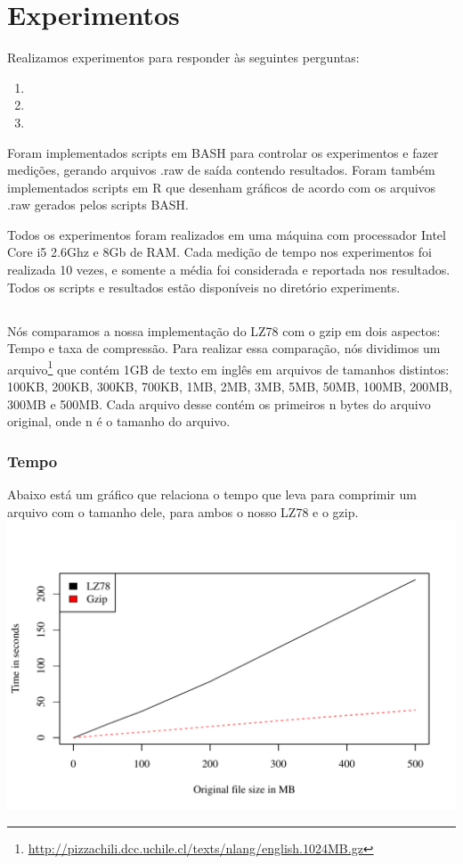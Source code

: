 \section{Experimentos}
Realizamos experimentos para responder às seguintes perguntas:
\begin{enumerate}
\item \rqone
\item \rqtwo
\item \rqthree
\end{enumerate}

Foram implementados scripts em BASH para controlar os experimentos e fazer
medições, gerando arquivos .raw de saída contendo resultados. Foram também
implementados scripts em R que desenham gráficos de acordo com os arquivos .raw
gerados pelos scripts BASH.


Todos os experimentos foram realizados em uma máquina com processador Intel Core
i5 2.6Ghz e 8Gb de RAM. Cada medição de tempo nos experimentos foi realizada 10
vezes, e somente a média foi considerada e reportada nos resultados.
Todos os scripts e resultados estão disponíveis no diretório experiments.

\subsection{\rqone}
Nós comparamos a nossa implementação do LZ78 com o gzip em dois aspectos: Tempo
e taxa de compressão.
Para realizar essa comparação, nós dividimos um arquivo\footnote{
\url{http://pizzachili.dcc.uchile.cl/texts/nlang/english.1024MB.gz}}
que contém 1GB de texto em inglês em arquivos de
tamanhos distintos: 100KB, 200KB, 300KB, 700KB, 1MB, 2MB, 3MB, 5MB, 50MB, 100MB,
200MB, 300MB e 500MB. Cada arquivo desse contém os primeiros n bytes do
arquivo original, onde n é o tamanho do arquivo.

\subsubsection{Tempo}

Abaixo está um gráfico que relaciona o tempo que leva para comprimir um arquivo
com o tamanho dele, para ambos o nosso LZ78 e o gzip.
\\
\includegraphics[scale=0.74]{../experiments/R/pdf/time_comp}
\\

